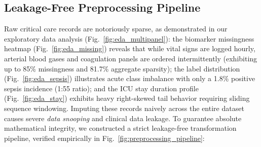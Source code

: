 \documentclass[journal,twocolumn,10pt]{IEEEtran}
\begin{document}
\subsection{Leakage-Free Preprocessing Pipeline}
Raw critical care records are notoriously sparse, as demonstrated in our exploratory data analysis (Fig.~\ref{fig:eda_multipanel}): the biomarker missingness heatmap (Fig.~\ref{fig:eda_missing}) reveals that while vital signs are logged hourly, arterial blood gases and coagulation panels are ordered intermittently (exhibiting up to 85\% missingness and 81.7\% aggregate sparsity); the label distribution (Fig.~\ref{fig:eda_sepsis}) illustrates acute class imbalance with only a 1.8\% positive sepsis incidence (1:55 ratio); and the ICU stay duration profile (Fig.~\ref{fig:eda_stay}) exhibits heavy right-skewed tail behavior requiring sliding sequence windowing. Imputing these records naively across the entire dataset causes severe \textit{data snooping} and clinical data leakage. To guarantee absolute mathematical integrity, we constructed a strict leakage-free transformation pipeline, verified empirically in Fig.~\ref{fig:preprocessing_pipeline}:
\end{document}
